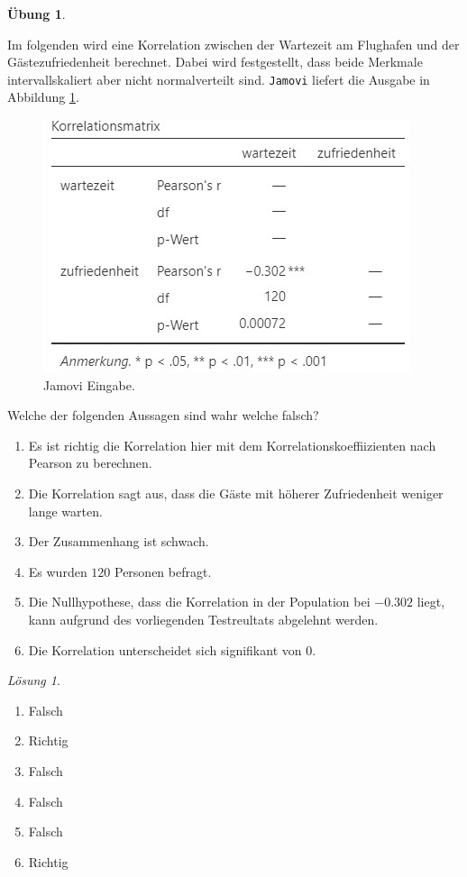 \documentclass[
]{book}
\providecommand{\tightlist}{%
  \setlength{\itemsep}{0pt}\setlength{\parskip}{0pt}}
\theoremstyle{definition}
\theoremstyle{definition}
\theoremstyle{definition}
\newtheorem{exercise}{Übung}[chapter]
\theoremstyle{definition}
\theoremstyle{remark}
\newtheorem*{solution}{Lösung}
\begin{document}
\begin{exercise}
\protect\hypertarget{exr:test-spearman}{}\label{exr:test-spearman}\leavevmode

Im folgenden wird eine Korrelation zwischen der Wartezeit am Flughafen und der Gästezufriedenheit berechnet. Dabei wird festgestellt, dass beide Merkmale intervallskaliert aber nicht normalverteilt sind. \texttt{Jamovi} liefert die Ausgabe in Abbildung \ref{fig:sol-test-spearman-output}.

\begin{figure}
\includegraphics[width=0.5\linewidth]{figures/08-exr-test-spearman-jmv-output} \caption{Jamovi Eingabe.}\label{fig:sol-test-spearman-output}
\end{figure}

Welche der folgenden Aussagen sind wahr welche falsch?

\begin{enumerate}
\def\labelenumi{\alph{enumi})}
\tightlist
\item
  Es ist richtig die Korrelation hier mit dem Korrelationskoeffiizienten nach Pearson zu berechnen.
\item
  Die Korrelation sagt aus, dass die Gäste mit höherer Zufriedenheit weniger lange warten.
\item
  Der Zusammenhang ist schwach.
\item
  Es wurden \(120\) Personen befragt.
\item
  Die Nullhypothese, dass die Korrelation in der Population bei \(-0.302\) liegt, kann aufgrund des vorliegenden Testreultats abgelehnt werden.
\item
  Die Korrelation unterscheidet sich signifikant von \(0\).
\end{enumerate}

\end{exercise}

\begin{solution}
\leavevmode

\begin{enumerate}
\def\labelenumi{\alph{enumi})}
\tightlist
\item
  Falsch
\item
  Richtig
\item
  Falsch
\item
  Falsch
\item
  Falsch
\item
  Richtig
\end{enumerate}

\end{solution}
\end{document}
